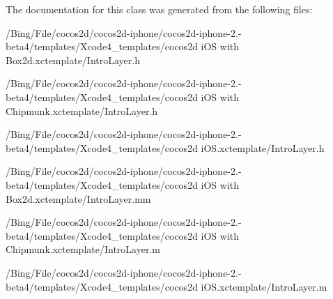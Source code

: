 The documentation for this class was generated from the following files\-:\begin{DoxyCompactItemize}
\item 
/\-Bing/\-File/cocos2d/cocos2d-\/iphone/cocos2d-\/iphone-\/2.-\/beta4/templates/\-Xcode4\-\_\-templates/cocos2d i\-O\-S with Box2d.\-xctemplate/Intro\-Layer.\-h\item 
/\-Bing/\-File/cocos2d/cocos2d-\/iphone/cocos2d-\/iphone-\/2.-\/beta4/templates/\-Xcode4\-\_\-templates/cocos2d i\-O\-S with Chipmunk.\-xctemplate/Intro\-Layer.\-h\item 
/\-Bing/\-File/cocos2d/cocos2d-\/iphone/cocos2d-\/iphone-\/2.-\/beta4/templates/\-Xcode4\-\_\-templates/cocos2d i\-O\-S.\-xctemplate/Intro\-Layer.\-h\item 
/\-Bing/\-File/cocos2d/cocos2d-\/iphone/cocos2d-\/iphone-\/2.-\/beta4/templates/\-Xcode4\-\_\-templates/cocos2d i\-O\-S with Box2d.\-xctemplate/Intro\-Layer.\-mm\item 
/\-Bing/\-File/cocos2d/cocos2d-\/iphone/cocos2d-\/iphone-\/2.-\/beta4/templates/\-Xcode4\-\_\-templates/cocos2d i\-O\-S with Chipmunk.\-xctemplate/Intro\-Layer.\-m\item 
/\-Bing/\-File/cocos2d/cocos2d-\/iphone/cocos2d-\/iphone-\/2.-\/beta4/templates/\-Xcode4\-\_\-templates/cocos2d i\-O\-S.\-xctemplate/Intro\-Layer.\-m\end{DoxyCompactItemize}
